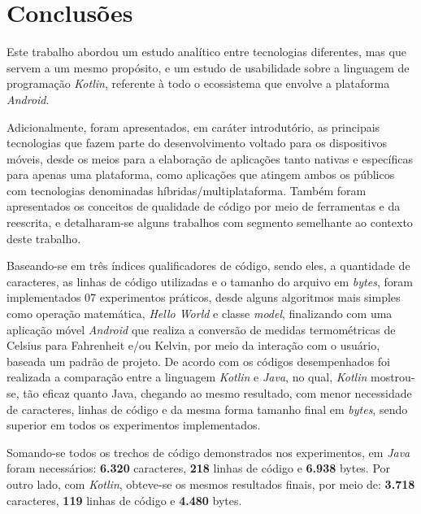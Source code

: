 \chapter{Conclusões}
\label{cap:05}

Este trabalho abordou um estudo analítico entre tecnologias diferentes, mas que servem a um mesmo propósito, e um estudo de usabilidade sobre a linguagem de programação \textit{Kotlin}, referente à todo o ecossistema que envolve a plataforma \textit{Android}.

Adicionalmente, foram apresentados, em caráter introdutório, as principais tecnologias que fazem parte do desenvolvimento voltado para os dispositivos móveis, desde os meios para a elaboração de aplicações tanto nativas e específicas para apenas uma plataforma, como aplicações que atingem ambos os públicos com tecnologias denominadas híbridas/multiplataforma. Também foram apresentados os conceitos de qualidade de código por meio de ferramentas e da reescrita, e detalharam-se alguns trabalhos com segmento semelhante ao contexto deste trabalho.

Baseando-se em três índices qualificadores de código, sendo eles, a quantidade de caracteres, as linhas de código utilizadas e o tamanho do arquivo em \textit{bytes}, foram implementados 07 experimentos práticos, desde alguns algoritmos mais simples como operação matemática, \textit{Hello World} e classe \textit{model}, finalizando com uma aplicação móvel \textit{Android} que realiza a conversão de medidas termométricas de Celsius para Fahrenheit e/ou Kelvin, por meio da interação com o usuário, baseada um padrão de projeto. De acordo com os códigos desempenhados foi realizada a comparação entre a linguagem \textit{Kotlin} e \textit{Java}, no qual, \textit{Kotlin} mostrou-se, tão eficaz quanto Java, chegando ao mesmo resultado, com menor necessidade de caracteres, linhas de código e da mesma forma tamanho final em \textit{bytes}, sendo superior em todos os experimentos implementados.

Somando-se todos os trechos de código demonstrados nos experimentos, em \textit{Java} foram necessários: \textbf{6.320} caracteres, \textbf{218} linhas de código e \textbf{6.938} bytes. Por outro lado, com \textit{Kotlin}, obteve-se os mesmos resultados finais, por meio de: \textbf{3.718} caracteres, \textbf{119} linhas de código e \textbf{4.480} bytes.

